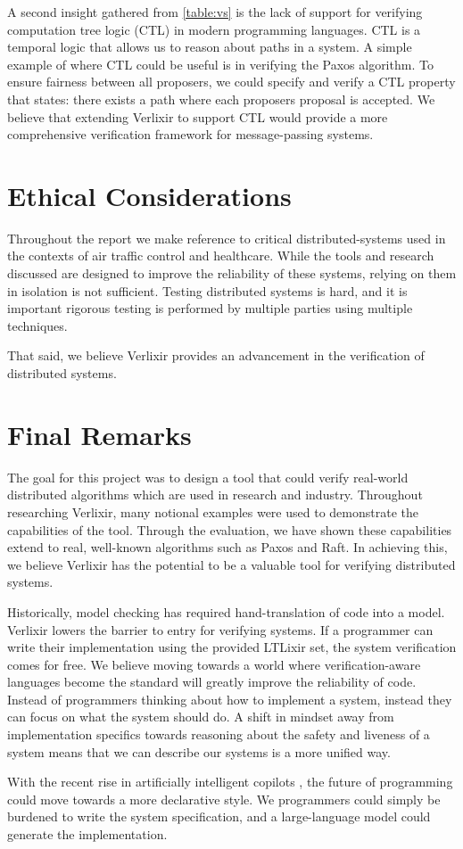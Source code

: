 \par
A second insight gathered from \ref{table:vs} is the lack of support for verifying computation tree logic (CTL) in modern programming languages. CTL is a temporal logic that allows us to reason about paths in a system. A simple example of where CTL could be useful is in verifying the Paxos algorithm. To ensure fairness between all proposers, we could specify and verify a CTL property that states: there exists a path where each proposers proposal is accepted. We believe that extending Verlixir to support CTL would provide a more comprehensive verification framework for message-passing systems.
\section{Ethical Considerations}
Throughout the report we make reference to critical distributed-systems used in the contexts of air traffic control and healthcare. While the tools and research discussed are designed to improve the reliability of these systems, relying on them in isolation is not sufficient. Testing distributed systems is hard, and it is important rigorous testing is performed by multiple parties using multiple techniques.
\par
That said, we believe Verlixir provides an advancement in the verification of distributed systems.
\section{Final Remarks}
The goal for this project was to design a tool that could verify real-world distributed algorithms which are used in research and industry. Throughout researching Verlixir, many notional examples were used to demonstrate the capabilities of the tool. Through the evaluation, we have shown these capabilities extend to real, well-known algorithms such as Paxos and Raft. In achieving this, we believe Verlixir has the potential to be a valuable tool for verifying distributed systems.
\par
Historically, model checking has required hand-translation of code into a model. Verlixir lowers the barrier to entry for verifying systems. If a programmer can write their implementation using the provided LTLixir set, the system verification comes for free. We believe moving towards a world where verification-aware languages become the standard will greatly improve the reliability of code. Instead of programmers thinking about how to implement a system, instead they can focus on what the system should do. A shift in mindset away from implementation specifics towards reasoning about the safety and liveness of a system means that we can describe our systems is a more unified way.
\par
With the recent rise in artificially intelligent copilots \cite{attention_is, copilot_asset,safety_ai}, the future of programming could move towards a more declarative style. We programmers could simply be burdened to write the system specification, and a large-language model could generate the implementation.